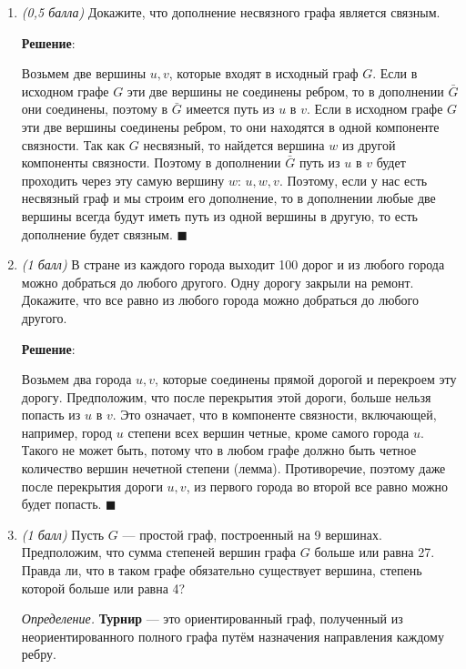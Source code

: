 \documentclass{article}
\begin{document}
\begin{enumerate}

    \item \textit{(0,5 балла)} Докажите, что дополнение несвязного графа является связным.
    
    \textbf{Решение}:

    Возьмем две вершины $u, v$, которые входят в исходный граф $G$. Если в исходном графе $G$ эти две вершины не соединены ребром, то в дополнении $\bar{G}$ они соединены, поэтому в $\bar{G}$ имеется путь из $u$ в $v$. Если в исходном графе $G$ эти две вершины соединены ребром, то они находятся в одной компоненте связности. Так как $G$ несвязный, то найдется вершина $w$ из другой компоненты связности. Поэтому в дополнении $\bar{G}$ путь из $u$ в $v$ будет проходить через эту самую вершину $w$: $u, w, v$. Поэтому, если у нас есть несвязный граф и мы строим его дополнение, то в дополнении любые две вершины всегда будут иметь путь из одной вершины в другую, то есть дополнение будет связным. $\blacksquare$

    \item \textit{(1 балл)} В стране из каждого города выходит 100 дорог и из любого города можно добраться до любого другого. Одну дорогу закрыли на ремонт. Докажите, что все равно из любого города можно добраться до любого другого.
    
    \textbf{Решение}:

    Возьмем два города $u, v$, которые соединены прямой дорогой и перекроем эту дорогу. Предположим, что после перекрытия этой дороги, больше нельзя попасть из $u$ в $v$. Это означает, что в компоненте связности, включающей, например, город $u$ степени всех вершин четные, кроме самого города $u$. Такого не может быть, потому что в любом графе должно быть четное количество вершин нечетной степени (лемма). Противоречие, поэтому даже после перекрытия дороги $u, v$, из первого города во второй все равно можно будет попасть. $\blacksquare$
    
    \item \textit{(1 балл)} Пусть $G$ --- простой граф, построенный на 9 вершинах. Предположим, что сумма степеней вершин графа $G$ больше или равна 27. Правда ли, что в таком графе обязательно существует вершина, степень которой больше или равна 4?
    
    \textit{Определение.} \textbf{Турнир} --- это ориентированный граф, полученный из неориентированного полного графа путём назначения направления каждому ребру.
    

\end{enumerate}
\end{document}
